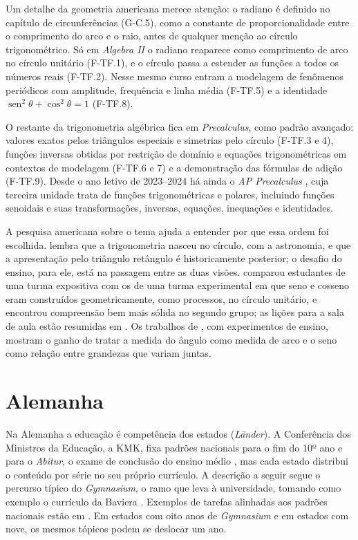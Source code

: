 \documentclass[
    article,
    12pt,
    a4paper,
    sumario=tradicional
]{abntex2}
\begin{document}
Um detalhe da geometria americana merece atenção: o radiano é definido no
capítulo de circunferências (G-C.5), como a constante de proporcionalidade
entre o comprimento do arco e o raio, antes de qualquer menção ao círculo
trigonométrico. Só em \textit{Algebra II} o radiano reaparece como comprimento
de arco no círculo unitário (F-TF.1), e o círculo passa a estender as funções
a todos os números reais (F-TF.2). Nesse mesmo curso entram a modelagem de
fenômenos periódicos com amplitude, frequência e linha média (F-TF.5) e a
identidade $\operatorname{sen}^2\theta + \cos^2\theta = 1$ (F-TF.8).

O restante da trigonometria algébrica fica em \textit{Precalculus}, como padrão
avançado: valores exatos pelos triângulos especiais e simetrias pelo círculo
(F-TF.3 e 4), funções inversas obtidas por restrição de domínio e equações
trigonométricas em contextos de modelagem (F-TF.6 e 7) e a demonstração das
fórmulas de adição (F-TF.9). Desde o ano letivo de 2023--2024 há ainda o
\textit{AP Precalculus} \cite{collegeboard2023}, cuja terceira unidade trata
de funções trigonométricas e polares, incluindo funções senoidais e suas
transformações, inversas, equações, inequações e identidades.

A pesquisa americana sobre o tema ajuda a entender por que essa ordem foi
escolhida.  lembra que a trigonometria nasceu no
círculo, com a astronomia, e que a apresentação pelo triângulo retângulo é
historicamente posterior; o desafio do ensino, para ele, está na passagem
entre as duas visões.  comparou estudantes de uma turma
expositiva com os de uma turma experimental em que seno e cosseno eram
construídos geometricamente, como processos, no círculo unitário, e encontrou
compreensão bem mais sólida no segundo grupo; as lições para a sala de aula
estão resumidas em . Os trabalhos de
, com experimentos de ensino, mostram o ganho
de tratar a medida do ângulo como medida de arco e o seno como relação entre
grandezas que variam juntas.

\section{Alemanha}

Na Alemanha a educação é competência dos estados (\textit{Länder}). A
Conferência dos Ministros da Educação, a KMK, fixa padrões nacionais para o
fim do 10º ano \cite{kmk2003} e para o \textit{Abitur}, o exame de conclusão do
ensino médio \cite{kmk2012}, mas cada estado distribui o conteúdo por série no
seu próprio currículo. A descrição a seguir segue o percurso típico do
\textit{Gymnasium}, o ramo que leva à universidade, tomando como exemplo o
currículo da Baviera \cite{isb_lehrplanplus}. Exemplos de tarefas alinhadas aos
padrões nacionais estão em . Em estados com oito anos de
\textit{Gymnasium} e em estados com nove, os mesmos tópicos podem se deslocar
um ano. %
\end{document}
